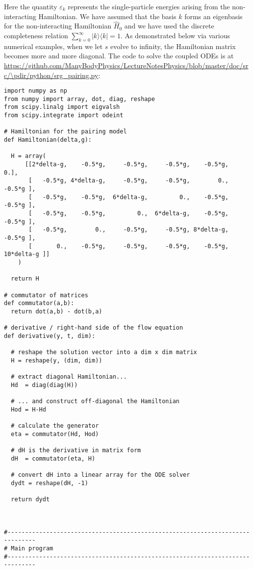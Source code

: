 Here the quantity $\varepsilon_k$ represents the single-particle
energies arising from the non-interacting Hamiltonian. We have assumed
that the basis $k$ forms an eigenbasis for the non-interacting
Hamiltonian $\hat{H}_0$ and we have used the discrete completeness
relation $\sum_{k=0}^{\infty}\vert k \rangle \langle k \vert = 1$.  As
demonstrated below via various numerical examples, when we let $s$
evolve to infinity, the Hamiltonian matrix becomes more and more
diagonal. The code to solve the coupled ODEs is at
\url{https://github.com/ManyBodyPhysics/LectureNotesPhysics/blob/master/doc/src/\pdir/python/srg_pairing.py}: 
\begin{lstlisting}
import numpy as np
from numpy import array, dot, diag, reshape
from scipy.linalg import eigvalsh
from scipy.integrate import odeint

# Hamiltonian for the pairing model
def Hamiltonian(delta,g):

  H = array(
      [[2*delta-g,    -0.5*g,     -0.5*g,     -0.5*g,    -0.5*g,          0.],
       [   -0.5*g, 4*delta-g,     -0.5*g,     -0.5*g,        0.,     -0.5*g ], 
       [   -0.5*g,    -0.5*g,  6*delta-g,         0.,    -0.5*g,     -0.5*g ], 
       [   -0.5*g,    -0.5*g,         0.,  6*delta-g,    -0.5*g,     -0.5*g ], 
       [   -0.5*g,        0.,     -0.5*g,     -0.5*g, 8*delta-g,     -0.5*g ], 
       [       0.,    -0.5*g,     -0.5*g,     -0.5*g,    -0.5*g, 10*delta-g ]]
    )

  return H

# commutator of matrices
def commutator(a,b):
  return dot(a,b) - dot(b,a)

# derivative / right-hand side of the flow equation
def derivative(y, t, dim):

  # reshape the solution vector into a dim x dim matrix
  H = reshape(y, (dim, dim))

  # extract diagonal Hamiltonian...
  Hd  = diag(diag(H))

  # ... and construct off-diagonal the Hamiltonian
  Hod = H-Hd

  # calculate the generator
  eta = commutator(Hd, Hod)

  # dH is the derivative in matrix form 
  dH  = commutator(eta, H)

  # convert dH into a linear array for the ODE solver
  dydt = reshape(dH, -1)
    
  return dydt



#------------------------------------------------------------------------------
# Main program
#------------------------------------------------------------------------------


\end{lstlisting}

